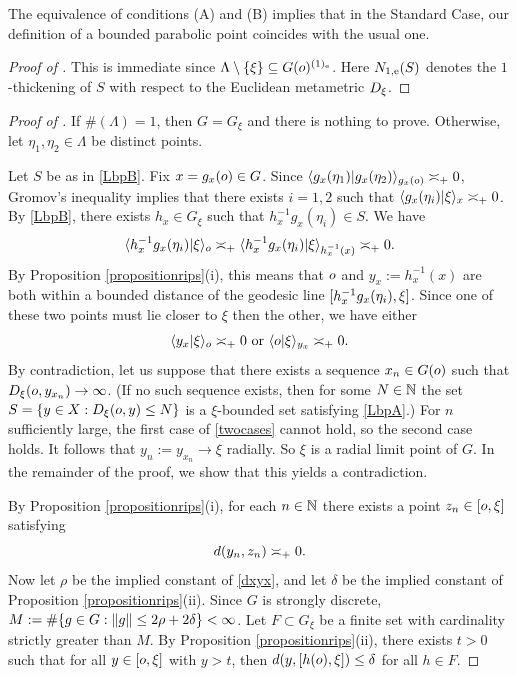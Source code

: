 \begin{remark}
\label{remarkLbpvsstandarddef}
The equivalence of conditions (A) and (B) implies that in the Standard Case, our definition of a bounded parabolic point coincides with the usual one.
\end{remark}



\begin{proof}[Proof of  \implies {}]
This is immediate since $\Lambda\setminus\{\xi\} \subseteq G(o)^{(1)_{\textup e}}$. Here $N_{1,{\textup e}}(S)$ denotes the $1$-thickening of $S$ with respect to the Euclidean metametric $D_\xi$.
\end{proof}
\begin{proof}[Proof of  \implies {}]
If $\#(\Lambda) = 1$, then $G = G_\xi$ and there is nothing to prove. Otherwise, let $\eta_1,\eta_2\in\Lambda$ be distinct points.

Let $S$ be as in \eqref{LbpB}. Fix $x = g_x(o)\in G$. Since $\langle g_x(\eta_1)|g_x(\eta_2)\rangle_{g_x(o)} \asymp_+ 0$, Gromov's inequality implies that there exists $i = 1,2$ such that $\langle g_x(\eta_i)|\xi\rangle_x \asymp_+ 0$. By \eqref{LbpB}, there exists $h_x\in G_\xi$ such that $h_x^{-1}g_x(\eta_i)\in S$. We have
\[
\langle h_x^{-1}g_x(\eta_i)|\xi\rangle_o \asymp_+ \langle h_x^{-1}g_x(\eta_i)|\xi\rangle_{h_x^{-1}(x)} \asymp_+ 0.
\]
By Proposition \ref{propositionrips}(i), this means that $o$ and $y_x := h_x^{-1}(x)$ are both within a bounded distance of the geodesic line $[h_x^{-1}g_x(\eta_i),\xi]$. Since one of these two points must lie closer to $\xi$ then the other, we have either
\begin{equation}
\label{twocases}
\langle y_x|\xi\rangle_o \asymp_+ 0 \textup{ or } \langle o|\xi\rangle_{y_x} \asymp_+ 0.
\end{equation}
By contradiction, let us suppose that there exists a sequence $x_n\in G(o)$ such that $D_\xi(o,y_{x_n}) \to \infty$. (If no such sequence exists, then for some $N\in\N$ the set $S = \{y\in X : D_\xi(o,y) \leq N\}$ is a $\xi$-bounded set satisfying \eqref{LbpA}.) For $n$ sufficiently large, the first case of \eqref{twocases} cannot hold, so the second case holds. It follows that $y_n := y_{x_n} \to \xi$ radially. So $\xi$ is a radial limit point of $G$. In the remainder of the proof, we show that this yields a contradiction.

By Proposition \ref{propositionrips}(i), for each $n\in\N$ there exists a point $z_n\in [o,\xi]$ satisfying
\begin{equation}
\label{dxyx}
d(y_n,z_n) \asymp_+ 0.
\end{equation}
Now let $\rho$ be the implied constant of \eqref{dxyx}, and let $\delta$ be the implied constant of Proposition \ref{propositionrips}(ii). Since $G$ is strongly discrete, $M := \#\{g\in G : \|g\| \leq 2\rho + 2\delta\} < \infty$. Let $F\subset G_\xi$ be a finite set with cardinality strictly greater than $M$. By Proposition \ref{propositionrips}(ii), there exists $t > 0$ such that for all $y\in[o,\xi]$ with $y > t$, then $d(y,[h(o),\xi]) \leq \delta$ for all $h\in F$.


\end{proof}
